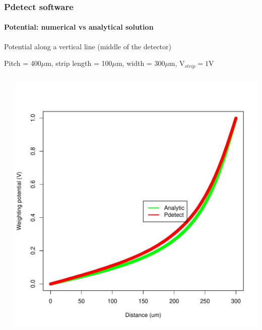 \documentclass[14pt]{beamer}
\begin{document}
\begin{frame}
  \frametitle{Pdetect software}
  \framesubtitle{Potential: numerical vs analytical solution}

  \fontsize{10pt}{7.2}\selectfont

  Potential along a vertical line (middle of the detector)

  Pitch = 400$\mu$m, strip length = 100$\mu$m, width = 300$\mu$m, V$_{strip} = 1$V

\vspace{-2em}

  \begin{columns}
      \begin{column}{0.5\textwidth}

        \begin{center}
        \end{center}
      \end{column}

      \begin{column}{0.5\textwidth}
        \begin{center}
          \includegraphics[width=\textwidth]{images/semi-free.pdf}
        \end{center}


\end{column}
\end{columns}
\end{frame}
\end{document}
